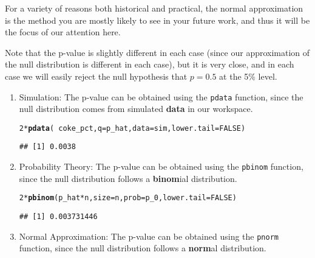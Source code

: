 \documentclass[10pt]{article}\usepackage[]{graphicx}\usepackage[]{color}
\makeatletter
\newcommand{\hlnum}[1]{\textcolor[rgb]{0.686,0.059,0.569}{#1}}%
\newcommand{\hlopt}[1]{\textcolor[rgb]{0,0,0}{#1}}%
\newcommand{\hlstd}[1]{\textcolor[rgb]{0.345,0.345,0.345}{#1}}%
\newcommand{\hlkwc}[1]{\textcolor[rgb]{0.333,0.667,0.333}{#1}}%
\newcommand{\hlkwd}[1]{\textcolor[rgb]{0.737,0.353,0.396}{\textbf{#1}}}%
\newenvironment{kframe}{%
 \def\at@end@of@kframe{}%
 \ifinner\ifhmode%
  \def\at@end@of@kframe{\end{minipage}}%
  \begin{minipage}{\columnwidth}%
 \fi\fi%
 \def\FrameCommand##1{\hskip\@totalleftmargin \hskip-\fboxsep
 \colorbox{shadecolor}{##1}\hskip-\fboxsep
     \hskip-\linewidth \hskip-\@totalleftmargin \hskip\columnwidth}%
 \MakeFramed {\advance\hsize-\width
   \@totalleftmargin\z@ \linewidth\hsize
   \@setminipage}}%
 {\par\unskip\endMakeFramed%
 \at@end@of@kframe}
\newenvironment{knitrout}{}{} %
\newcommand{\cmd}[1]{\texttt{#1}}
\makeatother
\begin{document}
\begin{enumerate}
  For a variety of reasons both historical and practical, the normal approximation is the method you are mostly likely to see in your future work, and thus it will be the focus of our attention here. 

\end{enumerate}

Note that the p-value is slightly different in each case (since our approximation of the null distribution is different in each case), but it is very close, and in each case we will easily reject the null hypothesis that $p = 0.5$ at the 5\% level. 

\begin{enumerate}
  \item Simulation: The p-value can be obtained using the \cmd{pdata} function, since the null distribution comes from simulated \textbf{data} in our workspace.

\begin{knitrout}
\color{fgcolor}\begin{kframe}
\begin{alltt}
\hlnum{2} \hlopt{*} \hlkwd{pdata}\hlstd{(}\hlopt{~}\hlstd{coke_pct,} \hlkwc{q} \hlstd{= p_hat,} \hlkwc{data} \hlstd{= sim,} \hlkwc{lower.tail} \hlstd{=} \hlnum{FALSE}\hlstd{)}
\end{alltt}
\begin{verbatim}
## [1] 0.0038
\end{verbatim}
\end{kframe}
\end{knitrout}
  \item Probability Theory: The p-value can be obtained using the \cmd{pbinom} function, since the null distribution follows a \textbf{binom}ial distribution.

\begin{knitrout}
\color{fgcolor}\begin{kframe}
\begin{alltt}
\hlnum{2} \hlopt{*} \hlkwd{pbinom}\hlstd{(p_hat} \hlopt{*} \hlstd{n,} \hlkwc{size} \hlstd{= n,} \hlkwc{prob} \hlstd{= p_0,} \hlkwc{lower.tail} \hlstd{=} \hlnum{FALSE}\hlstd{)}
\end{alltt}
\begin{verbatim}
## [1] 0.003731446
\end{verbatim}
\end{kframe}
\end{knitrout}
  \item Normal Approximation: The p-value can be obtained using the \cmd{pnorm} function, since the null distribution follows a \textbf{norm}al distribution.


\end{enumerate}
\end{document}
